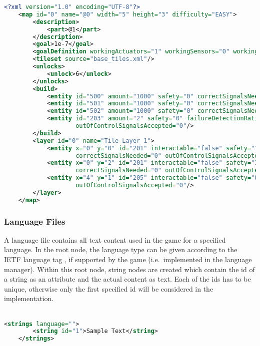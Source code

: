 \begin{lstlisting}[language=XML,label={lst:level-xml}]
    <?xml version="1.0" encoding="UTF-8"?>
    <map id="0" name="@0" width="5" height="3" difficulty="EASY">
        <description>
            <part>@1</part>
        </description>
        <goal>1e-7</goal>
        <goalDefinition workingActuators="1" workingSensors="0" workingComputers="0"/>
        <tileset source="base_tiles.xml"/>
        <unlocks>
            <unlock>6</unlock>
        </unlocks>
        <build>
            <entity id="500" amount="1000" safety="0" correctSignalsNeeded="1" outOfControlSignalsAccepted="0"/>
            <entity id="501" amount="1000" safety="0" correctSignalsNeeded="1" outOfControlSignalsAccepted="0"/>
            <entity id="502" amount="1000" safety="0" correctSignalsNeeded="1" outOfControlSignalsAccepted="0"/>
            <entity id="203" amount="2" safety="0" failureDetectionRatio="1" correctSignalsNeeded="1"
                    outOfControlSignalsAccepted="0"/>
        </build>
        <layer id="0" name="Tile Layer 1">
            <entity x="0" y="0" id="201" interactable="false" safety="1e-4" failureDetectionRatio="1"
                    correctSignalsNeeded="0" outOfControlSignalsAccepted="0"/>
            <entity x="0" y="2" id="201" interactable="false" safety="1e-4" failureDetectionRatio="1"
                    correctSignalsNeeded="0" outOfControlSignalsAccepted="0"/>
            <entity x="4" y="1" id="205" interactable="false" safety="0" failureDetectionRatio="1" correctSignalsNeeded="2"
                    outOfControlSignalsAccepted="0"/>
        </layer>
    </map>
\end{lstlisting}
\subsubsection{Language Files}\label{subsubsec:language-files}
A language file contains all text content used in the game for a specified language.
In the root node, the language type can be given according to the IETF language tag , if supported by the game (i.e.\ implemented in the language manager).
Within this root node, string nodes are created which contain the id of a string as an attribute and the actual content as text.
Each of the ids has to be unique, otherwise only the first specified id will be considered in the implementation.
\\
\\
\begin{lstlisting}[language=XML,label={lst:lang-xml}]
    <strings language="">
        <string id="1">Sample Text</string>
    </strings>
\end{lstlisting}

